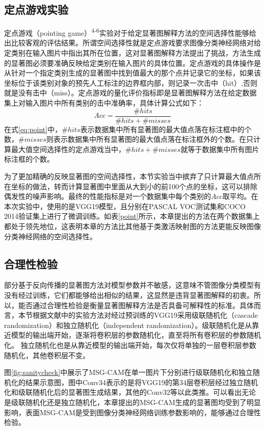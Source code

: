 \subsection{定点游戏实验}
定点游戏（pointing game）\textsuperscript{\cite{zhang2018top}4-6}实验对于给定显著图解释方法的空间选择性能够给出比较客观的评估结果。所谓空间选择性就是定点游戏要求图像分类神经网络对给定类别在输入图片中指出其所在位置，这对显著图解释方法提出了挑战，方法生成的显著图必须要准确反映给定类别在输入图片的具体位置。定点游戏的具体操作是从针对一个指定类别生成的显著图中找到值最大的那个点并记录它的坐标，如果该坐标位于该类别对象的预先人工标注的边界框内部，则记录一次击中（hit）,否则就是没有击中（miss）。定点游戏的量化评价指标即是显著图解释方法在给定数据集上对输入图片中所有类别的击中准确率，具体计算公式如下：
\begin{equation}
	Acc=\frac{\#hits}{\#hits+\#misses}
\label{eq:point}
\end{equation}
在式\ref{eq:point}中，$\#hits$表示数据集中所有显著图的最大值点落在标注框中的个数，$\#misses$则表示数据集中所有显著图的最大值点落在标注框外的个数。在只计算最大值空间选择性的定点游戏当中，$\#hits+\#misses$就等于数据集中所有图片标注框的个数。

为了更加精确的反映显著图的空间选择性，本节实验当中摈弃了只计算最大值点所在坐标的做法，转而计算显著图中里面从大到小的前100个点的坐标，这可以排除偶发性的噪声影响。最终的性能指标是对一个数据集中每个类别的$Acc$取平均。在本次实验中，使用的是VGG19模型，且分别在PASCAL VOC测试集和COCO 2014验证集上进行了微调训练。如表\ref{point}所示，本章提出的方法在两个数据集上都处于领先地位，这表明本章的方法比其他基于类激活映射图的方法更能反映图像分类神经网络的空间选择性。

\subsection{合理性检验}
部分基于反向传播的显著图方法对模型参数并不敏感，这意味不管图像分类模型有没有经过训练，它们都能够给出相似的结果，这显然是违背显著图解释的初衷。所以，能否通过合理性检验是衡量显著图解释方法是否具备可解释性的标准。具体而言，本节根据文献\cite{adebayo2018sanity}中的实验方法对经过预训练的VGG19采用级联随机化（cascade randomization）和独立随机化（independent randomization）。级联随机化是从靠近模型的输出端开始，逐渐将卷积层的参数随机化，直至将所有卷积层的参数随机化。 独立随机化也是从靠近模型的输出端开始，每次仅将单独的一层卷积层参数随机化，其他卷积层不变。

图\ref{fig:sanitycheck}中展示了MSG-CAM在单一图片下分别进行级联随机化和独立随机化的结果示意图，图中Conv34表示的是将VGG19的第34层卷积层经过独立随机化和级联随机化后的显著图生成结果，其他的Conv32等以此类推。可以看出无论是级联随机化还是独立随机化，本章提出的MSG-CAM生成的显著图均受到了明显影响，表面MSG-CAM是受到图像分类神经网络训练参数影响的，能够通过合理性检验。

